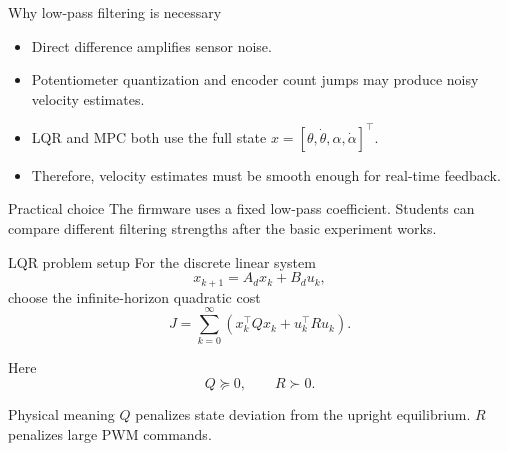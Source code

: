 \documentclass[aspectratio=169]{beamer}
\begin{document}
\begin{frame}{Why low-pass filtering is necessary}
\begin{itemize}
    \item Direct difference amplifies sensor noise.
    \vspace{0.25cm}
    \item Potentiometer quantization and encoder count jumps may produce noisy velocity estimates.
    \vspace{0.25cm}
    \item LQR and MPC both use the full state $x=[\theta,\dot\theta,\alpha,\dot\alpha]^\top$.
    \vspace{0.25cm}
    \item Therefore, velocity estimates must be smooth enough for real-time feedback.
\end{itemize}

\vspace{0.25cm}
\begin{block}{Practical choice}
\small
The firmware uses a fixed low-pass coefficient. Students can compare different filtering strengths after the basic experiment works.
\end{block}
\end{frame}

\begin{frame}{LQR problem setup}
For the discrete linear system
\[
x_{k+1}=A_d x_k+B_d u_k,
\]
choose the infinite-horizon quadratic cost
\[
J=\sum_{k=0}^{\infty}
\left(
x_k^\top Qx_k+u_k^\top Ru_k
\right).
\]

\vspace{0.2cm}

Here
\[
Q\succeq 0,
\qquad
R\succ0.
\]

\vspace{0.2cm}
\begin{block}{Physical meaning}
\small
$Q$ penalizes state deviation from the upright equilibrium. $R$ penalizes large PWM commands.
\end{block}
\end{frame}
\end{document}
